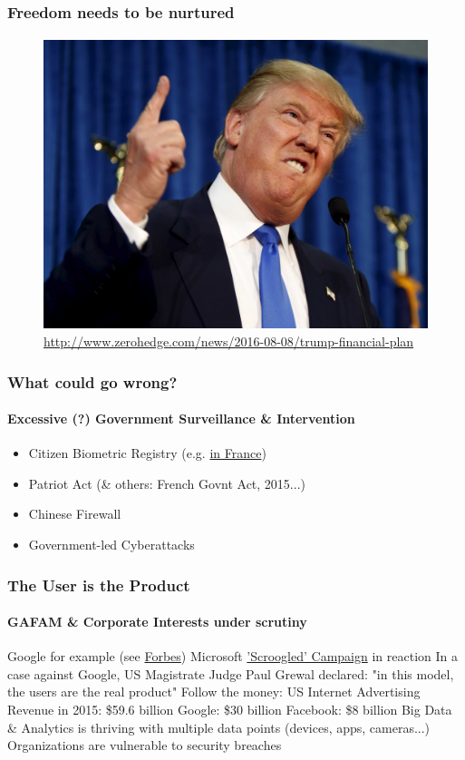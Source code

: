 \documentclass{beamer}
\begin{document}
	\begin{frame}
	\frametitle{Freedom needs to be nurtured}
	\framesubtitle{}
	        \begin{figure}[h]
                \centering
                \includegraphics[width=.8\textwidth]{./images/Trump_fingerup}
		\caption{\tiny\url{http://www.zerohedge.com/news/2016-08-08/trump-financial-plan}}
        	\end{figure}
	\end{frame}

	\begin{frame}
	\frametitle{What could go wrong?}
	\framesubtitle{Excessive (?) Government Surveillance \& Intervention}
		\begin{itemize}[<+->]
			\item Citizen Biometric Registry (e.g. \href{http://www.pcworld.com/article/3139461/security/french-plan-for-biometric-database-of-60-million-people-sparks-outcry.html}{in France})
			\item Patriot Act (\& others: French Govnt Act, 2015...)
			\item Chinese Firewall
			\item Government-led Cyberattacks
		\end{itemize}
	\end{frame}

	\begin{frame}
	\frametitle{The User is the Product}
	\framesubtitle{GAFAM \& Corporate Interests under scrutiny}
		\begin{outline}
			\1 Google for example (see \href{http://www.forbes.com/sites/benkepes/2013/12/04/google-users-youre-the-product-not-the-customer/\#2871b0bc1624}{Forbes})
			\1 Microsoft \href{http://www.businessinsider.com/microsoft-shuts-down-scroogled-website-2015-1}{'Scroogled' Campaign} in reaction
			\1 In a case against Google, US Magistrate Judge Paul Grewal declared: "in this model, the users are the real product"
			\1 Follow the money:
				\2 US Internet Advertising Revenue in 2015: \$59.6 billion
				\2 Google: \$30 billion
				\2 Facebook: \$8 billion
			\1 Big Data \& Analytics is thriving with multiple data points (devices, apps, cameras...)
			\1 Organizations are vulnerable to security breaches
		\end{outline}
	\end{frame}
\end{document}
